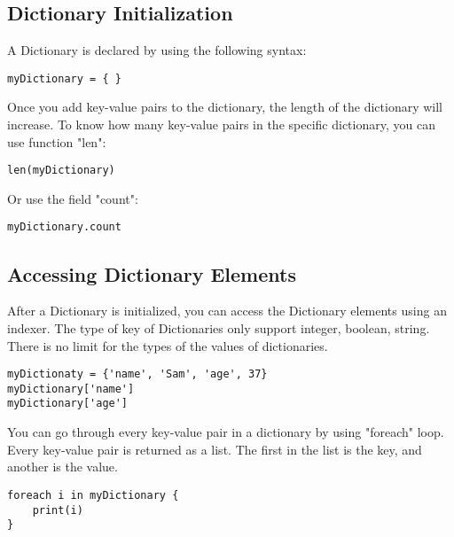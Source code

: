 \subsection{Dictionary Initialization}
A Dictionary is declared by using the following syntax:

\begin{lstlisting}
myDictionary = { }
\end{lstlisting}

Once you add key-value pairs to the dictionary, the length of the dictionary will increase. To know how many key-value pairs in the specific dictionary, you can use function "len":

\begin{lstlisting}
len(myDictionary)
\end{lstlisting}

Or use the field "count":

\begin{lstlisting}
myDictionary.count
\end{lstlisting}

\subsection{Accessing Dictionary Elements}
After a Dictionary is initialized, you can access the Dictionary elements using an indexer. The type of key of Dictionaries only support integer, boolean, string. There is no limit for the types of the values of dictionaries.

\begin{lstlisting}
myDictionaty = {'name', 'Sam', 'age', 37}
myDictionary['name']
myDictionary['age']
\end{lstlisting}

You can go through every key-value pair in a dictionary by using "foreach" loop. Every key-value pair is returned as a list. The first in the list is the key, and another is the value.

\begin{lstlisting}
foreach i in myDictionary {
	print(i)
}
\end{lstlisting}


